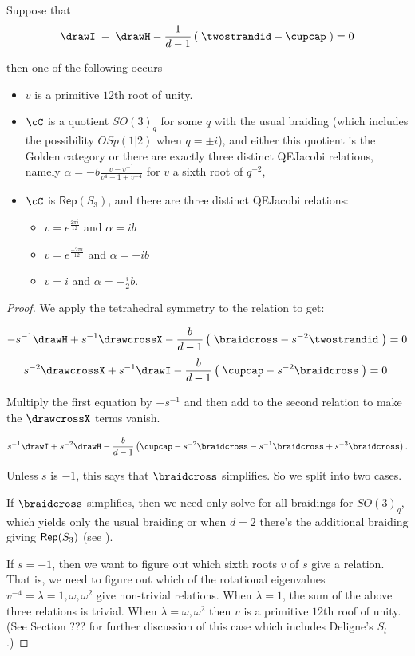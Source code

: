 \documentclass[12pt]{amsart}
\begin{document}
\begin{lemma} \label{lem:IequalsH}
Suppose that 
$$\drawI\;- \; \drawH - \frac{1}{d-1} \left(\; \twostrandid - \cupcap \;\right) = 0$$

then one of the following occurs

\begin{itemize}
\item $v$ is a primitive $12$th root of unity.

\item
$\cC$ is a quotient $SO(3)_q$ for some $q$ with the usual braiding (which
includes the possibility $OSp(1|2)$ when $q= \pm i$), and either this quotient
is the Golden category or there are exactly three distinct QEJacobi relations,
namely $\alpha = -b \frac{v-v^{-1}}{v^4-1+v^{-4}}$ for $v$ a sixth root of
$q^{-2}$,

\item
$\cC$ is  $\mathsf{Rep}(S_3)$, and there are three distinct QEJacobi
relations:

\begin{itemize}
\item $v = e^{\frac{2 \pi i}{12}}$ and $\alpha = i b$
\item $v = e^{\frac{-2 \pi i}{12}}$ and $\alpha = -i b$
\item $v = i$ and $\alpha = -\frac{i}{2} b$.
\end{itemize}

\end{itemize}
\end{lemma}
\begin{proof}
We apply the tetrahedral symmetry to the relation to get:

$$-s^{-1} \drawH + s^{-1} \drawcrossX -\frac{b}{d-1} \left(\; \braidcross - s^{-2} \twostrandid \; \right) = 0$$
$$s^{-2} \drawcrossX + s^{-1} \drawI -\frac{b}{d-1} \left(\; \cupcap -s^{-2} \braidcross \; \right) = 0.$$

Multiply the first equation by $-s^{-1}$ and then add to the second relation to make the $\drawcrossX$ terms vanish.

$$s^{-1} \drawI + s^{-2} \drawH - \frac{b}{d-1} \left(\cupcap -s^{-2} \braidcross -s^{-1}\braidcross + s^{-3}\braidcross  \right).$$

Unless $s$ is $-1$, this says that $\braidcross$ simplifies.  So we split into two cases.

If $\braidcross$ simplifies, then we need only solve for all braidings for
$SO(3)_q$, which yields only the usual braiding or when $d=2$ there's the
additional braiding giving $\operatorname{\mathsf{Rep}}(S_3)$ (see \cite{???}).

If $s = -1$, then we want to figure out which sixth roots $v$ of $s$ give a
relation.  That is, we need to figure out which of the rotational eigenvalues
$v^{-4} = \lambda = 1, \omega, \omega^2$ give non-trivial relations.  When
$\lambda = 1$, the sum of the above three relations is trivial.  When $\lambda
= \omega, \omega^2$ then $v$ is a primitive $12$th roof of unity.  (See
Section ??? for further discussion of this case which includes Deligne's
$S_t$.)
\end{proof}
\end{document}
